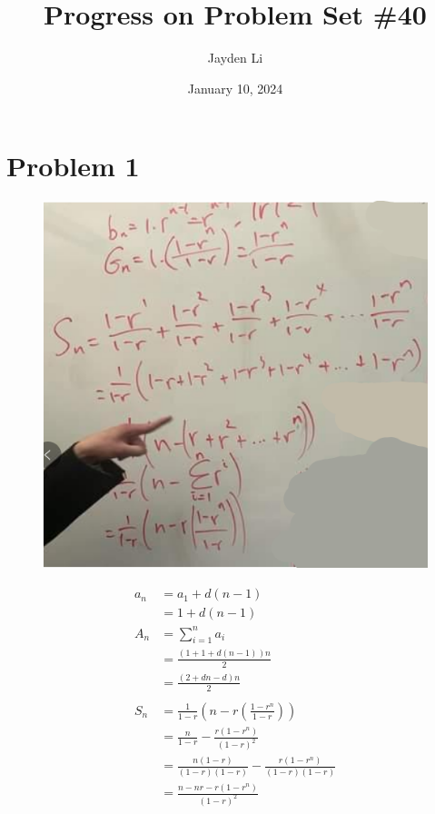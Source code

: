 \documentclass{article}
\title{Progress on Problem Set \#40}
\author{Jayden Li}
\date{January 10, 2024}
\begin{document}
\fontsize{12pt}{12pt}\selectfont

\maketitle

\section*{Problem 1}
\begin{figure}[ht]
	\begin{minipage}[t]{0.55\linewidth}
		\centering
		\includegraphics[width=\linewidth, valign=t]{q1.png}
	\end{minipage}
	\begin{minipage}[t]{0.4\linewidth}
	\setlength{\abovedisplayskip}{0pt}
	\begin{align*}
		a_n&=a_1+d(n-1) \\
		&=1+d(n-1) \\
		A_n&=\sum_{i=1}^{n}a_i \\
		&=\frac{(1+1+d(n-1))n}{2} \\
		&=\frac{(2+dn-d)n}{2} \\
		\\
		S_n&=\frac{1}{1-r}\left(n-r\left(\frac{1-r^n}{1-r}\right)
			\right) \\
		&=\frac{n}{1-r}-\frac{r(1-r^n)}{(1-r)^2} \\
		&=\frac{n(1-r)}{(1-r)(1-r)}-\frac{r(1-r^n)}{(1-r)(1-r)} \\
		&=\frac{n-nr-r(1-r^n)}{(1-r)^2}
	\end{align*}
	\end{minipage}
\end{figure}
\end{document}
